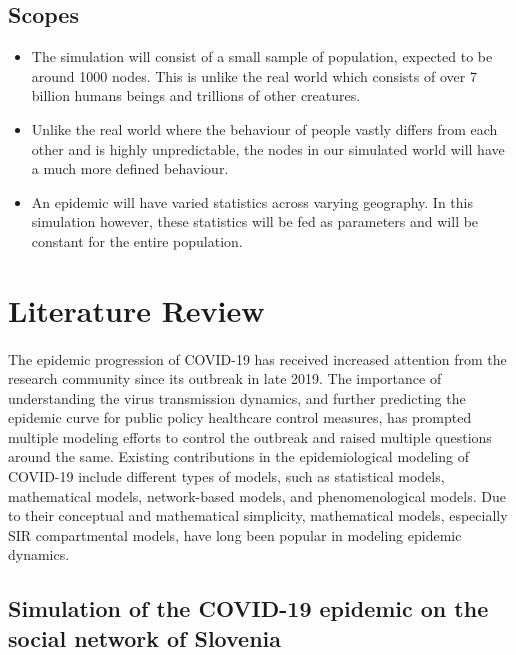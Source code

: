 \documentclass[14pt, a4paper]{extarticle}
\begin{document}
	    \subsection{Scopes}
    	    \begin{itemize}
    	        \item The simulation will consist of a small sample of population, expected to be around 1000 nodes. This is unlike the real world which consists of over 7 billion humans beings and trillions of other creatures.
    	        
    	        \item Unlike the real world where the behaviour of people vastly differs from each other and is highly unpredictable, the nodes in our simulated world will have a much more defined behaviour.
    	        
    	        \item An epidemic will have varied statistics across varying geography. In this simulation however, these statistics will be fed as parameters and will be constant for the entire population.
    	    \end{itemize}
	
	\newpage
	\section{Literature Review}
	    \paragraph{} The epidemic progression of COVID-19 has received increased attention from the research community since its outbreak in late 2019. The importance of understanding the virus transmission dynamics, and further predicting the epidemic curve for public policy healthcare control measures, has prompted multiple modeling efforts to control the outbreak and raised multiple questions around the same. Existing contributions in the epidemiological modeling of COVID-19 include different types of models, such as statistical models, mathematical models, network-based models, and phenomenological models. Due to their conceptual and mathematical simplicity, mathematical models, especially SIR compartmental models, have long been popular in modeling epidemic dynamics.
	    
	    \subsection{Simulation of the COVID-19 epidemic on the social network of Slovenia}
\end{document}
